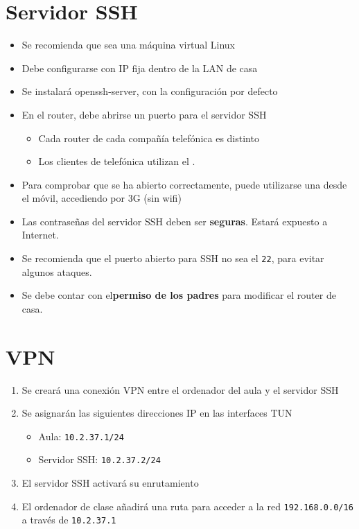 \section{Servidor SSH}
\begin{itemize}
\item Se recomienda que sea una máquina virtual Linux
\item Debe configurarse con IP fija dentro de la LAN de casa
\item Se instalará openssh-server, con la configuración por defecto
\item En el router, debe abrirse un puerto para el servidor SSH
  \begin{itemize}
  \item Cada router de cada compañía telefónica es distinto
  \item Los clientes de telefónica utilizan el .
  \end{itemize}
\item Para comprobar que se ha abierto correctamente, puede utilizarse una  desde el móvil, accediendo por 3G (sin wifi)
\end{itemize}

\begin{Aviso}
  \begin{itemize}
  \item Las contraseñas del servidor SSH deben ser \textbf{seguras}. Estará expuesto a Internet.
  \item Se recomienda que el puerto abierto para SSH no sea el \texttt{22}, para evitar algunos ataques.
  \item Se debe contar con el\textbf{permiso de los padres} para modificar el router de casa.
  \end{itemize}
\end{Aviso}


\section{VPN}
\begin{enumerate}
\item Se creará una conexión VPN entre el ordenador del aula y el servidor SSH
\item Se asignarán las siguientes direcciones IP en las interfaces TUN
  \begin{itemize}
  \item Aula: \texttt{10.2.37.1/24}
  \item Servidor SSH: \texttt{10.2.37.2/24}
  \end{itemize}
\item El servidor SSH activará su enrutamiento
  
\item El ordenador de clase añadirá una ruta para acceder a la red \texttt{192.168.0.0/16} a través de \texttt{10.2.37.1}
  
\end{enumerate}

